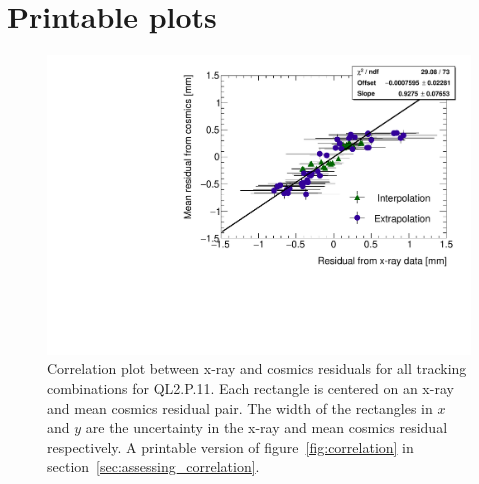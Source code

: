 
\chapter[Printable plots]{Printable plots}
\label{appendix:print}

\begin{figure}
    \centering
    \includegraphics[width = \textwidth]{figures/figure_QL2P11_3100V_2021-08-05_QL2P11_local_cosmic_and_xray_data_correlation_plot_printable.pdf}
    \caption{Correlation plot between x-ray and cosmics residuals for all tracking combinations for QL2.P.11. Each rectangle is centered on an x-ray and mean cosmics residual pair. The width of the rectangles in $x$ and $y$ are the uncertainty in the x-ray and mean cosmics residual respectively. A printable version of figure~\ref{fig:correlation} in section~\ref{sec:assessing_correlation}.}
    \label{fig:correlation_print}
\end{figure}

